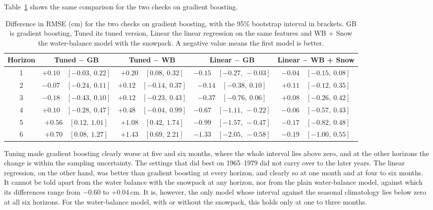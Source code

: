 \documentclass{article}
\begin{document}
Table~\ref{tab:boot3} shows the same comparison for the two checks on gradient boosting.

\begin{table}[htbp]
\centering
\caption{Difference in RMSE (cm) for the two checks on gradient boosting, with the 95\% bootstrap
interval in brackets. GB is gradient boosting, Tuned its tuned version, Linear the linear
regression on the same features and WB + Snow the water-balance model with the snowpack. A
negative value means the first model is better.}
\label{tab:boot3}
\small
\begin{tabular}{||c|c|c|c|c||}
\hline\hline
Horizon & Tuned $-$ GB & Tuned $-$ WB & Linear $-$ GB & Linear $-$ WB + Snow \\
\hline\hline
1 & $+0.10$\ \ $[-0.03,\ 0.22]$ & $+0.20$\ \ $[0.08,\ 0.32]$ & $-0.15$\ \ $[-0.27,\ -0.03]$
& $-0.04$\ \ $[-0.15,\ 0.08]$ \\
2 & $-0.07$\ \ $[-0.24,\ 0.11]$ & $+0.12$\ \ $[-0.14,\ 0.37]$ & $-0.14$\ \ $[-0.38,\ 0.10]$
& $+0.11$\ \ $[-0.12,\ 0.35]$ \\
3 & $-0.18$\ \ $[-0.43,\ 0.10]$ & $+0.12$\ \ $[-0.23,\ 0.43]$ & $-0.37$\ \ $[-0.76,\ 0.06]$
& $+0.08$\ \ $[-0.26,\ 0.42]$ \\
4 & $+0.10$\ \ $[-0.28,\ 0.47]$ & $+0.48$\ \ $[-0.04,\ 0.99]$ & $-0.67$\ \ $[-1.11,\ -0.22]$
& $-0.06$\ \ $[-0.57,\ 0.43]$ \\
5 & $+0.56$\ \ $[0.12,\ 1.01]$ & $+1.08$\ \ $[0.42,\ 1.74]$ & $-0.99$\ \ $[-1.57,\ -0.47]$
& $-0.17$\ \ $[-0.82,\ 0.48]$ \\
6 & $+0.70$\ \ $[0.08,\ 1.27]$ & $+1.43$\ \ $[0.69,\ 2.21]$ & $-1.33$\ \ $[-2.05,\ -0.58]$
& $-0.19$\ \ $[-1.00,\ 0.55]$ \\
\hline\hline
\end{tabular}
\end{table}

Tuning made gradient boosting clearly worse at five and six months, where the whole interval
lies above zero, and at the other horizons the change is within the sampling uncertainty. The
settings that did best on 1965--1979 did not carry over to the later years. The linear
regression, on the other hand, was better than gradient boosting at every horizon, and clearly so
at one month and at four to six months. It cannot be told apart from the water balance with the
snowpack at any horizon, nor from the plain water-balance model, against which its differences
range from $-0.60$ to $+0.04$\,cm. It is, however, the only model whose interval against the
seasonal climatology lies below zero at all six horizons. For the water-balance model, with or
without the snowpack, this holds only at one to three months.
\end{document}
